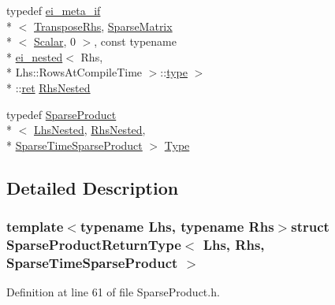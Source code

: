 \begin{DoxyCompactItemize}
\item 
typedef \hyperlink{structei__meta__if}{ei\-\_\-meta\-\_\-if}\\*
$<$ \hyperlink{struct_sparse_product_return_type_3_01_lhs_00_01_rhs_00_01_sparse_time_sparse_product_01_4_a125937488499be7d1fd0fdc811d8b53ea4a2f6d251efbbf832a56a1a293f821de}{Transpose\-Rhs}, \hyperlink{class_sparse_matrix}{Sparse\-Matrix}\\*
$<$ \hyperlink{struct_sparse_product_return_type_3_01_lhs_00_01_rhs_00_01_sparse_time_sparse_product_01_4_a2289d55762c6c97f479a08596a6f4f0e}{Scalar}, 0 $>$, const typename \\*
\hyperlink{structei__nested}{ei\-\_\-nested}$<$ Rhs, \\*
Lhs\-::\-Rows\-At\-Compile\-Time $>$\-::\hyperlink{glext_8h_a7d05960f4f1c1b11f3177dc963a45d86}{type} $>$\\*
\-::\hyperlink{group___i_p_conn_plugin_gabc99fe6afec1a75ccff1092e47375a40}{ret} \hyperlink{struct_sparse_product_return_type_3_01_lhs_00_01_rhs_00_01_sparse_time_sparse_product_01_4_aeb21908c46a3a9a5d0418934aede1f49}{Rhs\-Nested}
\item 
typedef \hyperlink{class_sparse_product}{Sparse\-Product}\\*
$<$ \hyperlink{struct_sparse_product_return_type_3_01_lhs_00_01_rhs_00_01_sparse_time_sparse_product_01_4_a9291f9481846fe6baef1c645df03180a}{Lhs\-Nested}, \hyperlink{struct_sparse_product_return_type_3_01_lhs_00_01_rhs_00_01_sparse_time_sparse_product_01_4_aeb21908c46a3a9a5d0418934aede1f49}{Rhs\-Nested}, \\*
\hyperlink{_constants_8h_a19539c4a85742928cd91d83569d63c06a93822fde7ec6e0d227b1d2cff44aa54c}{Sparse\-Time\-Sparse\-Product} $>$ \hyperlink{struct_sparse_product_return_type_3_01_lhs_00_01_rhs_00_01_sparse_time_sparse_product_01_4_a5ea95e31b214512f0ecc2ad2fcabe22d}{Type}
\end{DoxyCompactItemize}


\subsection{Detailed Description}
\subsubsection*{template$<$typename Lhs, typename Rhs$>$struct Sparse\-Product\-Return\-Type$<$ Lhs, Rhs, Sparse\-Time\-Sparse\-Product $>$}



Definition at line 61 of file Sparse\-Product.\-h.



